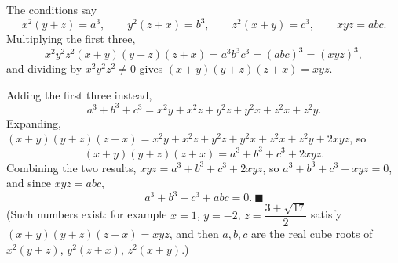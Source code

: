 The conditions say
\[x^2(y+z)=a^3,\qquad y^2(z+x)=b^3,\qquad z^2(x+y)=c^3,\qquad xyz=abc.\]
Multiplying the first three,
\[x^2y^2z^2(x+y)(y+z)(z+x)=a^3b^3c^3=(abc)^3=(xyz)^3,\]
and dividing by $x^2y^2z^2\ne0$ gives $(x+y)(y+z)(z+x)=xyz$.

Adding the first three instead,
\[a^3+b^3+c^3=x^2y+x^2z+y^2z+y^2x+z^2x+z^2y.\]
Expanding, $(x+y)(y+z)(z+x)=x^2y+x^2z+y^2z+y^2x+z^2x+z^2y+2xyz$, so
\[(x+y)(y+z)(z+x)=a^3+b^3+c^3+2xyz.\]
Combining the two results, $xyz=a^3+b^3+c^3+2xyz$, so $a^3+b^3+c^3+xyz=0$, and since $xyz=abc$,
\[a^3+b^3+c^3+abc=0.\ \blacksquare\]
(Such numbers exist: for example $x=1$, $y=-2$, $z=\dfrac{3+\sqrt{17}}{2}$ satisfy $(x+y)(y+z)(z+x)=xyz$, and then $a,b,c$ are the real cube roots of $x^2(y+z)$, $y^2(z+x)$, $z^2(x+y)$.)
